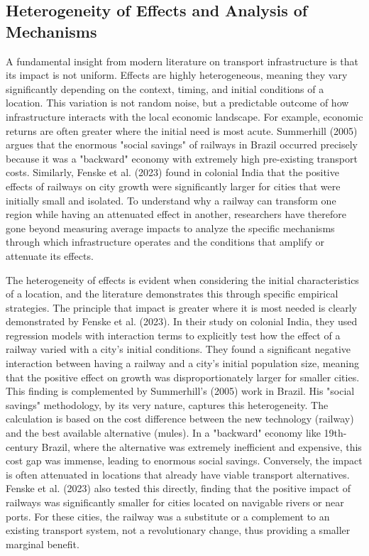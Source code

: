 \documentclass[12pt, a4paper]{article}
\begin{document}
\subsection{Heterogeneity of Effects and Analysis of Mechanisms}
A fundamental insight from modern literature on transport infrastructure is that its impact is not uniform. Effects are highly heterogeneous, meaning they vary significantly depending on the context, timing, and initial conditions of a location. This variation is not random noise, but a predictable outcome of how infrastructure interacts with the local economic landscape. For example, economic returns are often greater where the initial need is most acute. Summerhill (2005) argues that the enormous "social savings" of railways in Brazil occurred precisely because it was a "backward" economy with extremely high pre-existing transport costs. Similarly, Fenske et al. (2023) found in colonial India that the positive effects of railways on city growth were significantly larger for cities that were initially small and isolated. To understand why a railway can transform one region while having an attenuated effect in another, researchers have therefore gone beyond measuring average impacts to analyze the specific mechanisms through which infrastructure operates and the conditions that amplify or attenuate its effects. 

The heterogeneity of effects is evident when considering the initial characteristics of a location, and the literature demonstrates this through specific empirical strategies. The principle that impact is greater where it is most needed is clearly demonstrated by Fenske et al. (2023). In their study on colonial India, they used regression models with interaction terms to explicitly test how the effect of a railway varied with a city's initial conditions. They found a significant negative interaction between having a railway and a city's initial population size, meaning that the positive effect on growth was disproportionately larger for smaller cities. This finding is complemented by Summerhill's (2005) work in Brazil. His "social savings" methodology, by its very nature, captures this heterogeneity. The calculation is based on the cost difference between the new technology (railway) and the best available alternative (mules). In a "backward" economy like 19th-century Brazil, where the alternative was extremely inefficient and expensive, this cost gap was immense, leading to enormous social savings. Conversely, the impact is often attenuated in locations that already have viable transport alternatives. Fenske et al. (2023) also tested this directly, finding that the positive impact of railways was significantly smaller for cities located on navigable rivers or near ports. For these cities, the railway was a substitute or a complement to an existing transport system, not a revolutionary change, thus providing a smaller marginal benefit.
\end{document}
